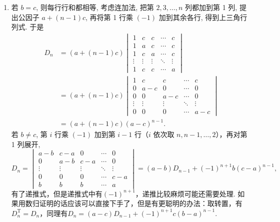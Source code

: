\begin{enumerate}
    \item 若 $b=c$, 则每行行和都相等, 考虑连加法, 把第 $2,3, \ldots, n$ 列都加到第 1 列, 提出公因子 $a+(n-1) c$, 再将第 1 行乘 $(-1)$ 加到其余各行, 得到上三角行列式. 于是
          \begin{align*}
              D_{n} & =(a+(n-1) c)\begin{vmatrix}
                                      1      & c      & c      & \cdots & c      \\
                                      1      & a      & c      & \cdots & c      \\
                                      1      & c      & a      & \cdots & c      \\
                                      \vdots & \vdots & \vdots & \ddots & \vdots \\
                                      1      & c      & c      & \cdots & a
                                  \end{vmatrix} \\
                    & =(a+(n-1) c)\begin{vmatrix}
                                      1      & c      & c      & \cdots & c      \\
                                      0      & a-c    & 0      & \cdots & 0      \\
                                      0      & 0      & a-c    & \cdots & 0      \\
                                      \vdots & \vdots & \vdots & \ddots & \vdots \\
                                      0      & 0      & 0      & \cdots & a-c
                                  \end{vmatrix} \\
                    & =(a+(n-1) c)(a-c)^{n-1} .
          \end{align*}
          若 $b \neq c$, 第 $i$ 行乘 $(-1)$ 加到第 $i-1$ 行（$i$ 依次取 $n, n-1, \ldots, 2$），再对第 1 列展开,
          \[D_{n}=\begin{vmatrix}
                  a-b    & c-a    & 0      & \cdots & 0      \\
                  0      & a-b    & c-a    & \cdots & 0      \\
                  \vdots & \vdots & \vdots & \ddots & \vdots \\
                  0      & 0      & 0      & \cdots & c-a    \\
                  b      & b      & b      & \cdots & a
              \end{vmatrix}=(a-b)D_{n-1}+(-1)^{n+1}b(c-a)^{n-1},\]
          有了递推式，但是递推式中有$(-1)^{n+1}$，递推比较麻烦可能还需要处理. 如果用数归证明的话应该可以直接下手了，但是有更聪明的办法：取转置，有$D_n^\mathrm{T}=D_n$，同理有$D_n=(a-c)D_{n-1}+(-1)^{n+1}c(b-a)^{n-1}$.


\end{enumerate}
